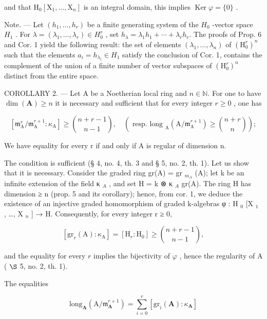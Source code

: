 and that \(\mathrm{H}_0[\mathrm{X}_1, \dots, \mathrm{X}_n]\) is an integral domain, this implies \(\operatorname{Ker} \varphi = \{0\}\) .

Note. --- Let \((h_{1}, \ldots, h_{r})\) be a finite generating system of the \(H_{0}\) -vector space \(H_{1}\) . For \(\lambda = (\lambda_{1}, \ldots, \lambda_{r}) \in H_{0}^{r}\) , set \(h_{\lambda} = \lambda_{1} h_{1} + \cdots + \lambda_{r} h_{r}\). The proofs of Prop. 6 and Cor. 1 yield the following result: the set of elements \((\lambda_{1}, \ldots, \lambda_{n})\) of \((\mathrm{H}_{0}^{r})^{n}\) such that the elements \(a_{i} = h_{\lambda_{i}} \in H_{1}\) satisfy the conclusion of Cor. 1, contains the complement of the union of a finite number of vector subspaces of \((\mathrm{H}_{0}^{r})^{n}\) distinct from the entire space.

COROLLARY 2. --- Let A be a Noetherian local ring and \(n\in\mathbb{N}\). For one to have \(\dim(\mathbf{A})\geqslant n\) it is necessary and sufficient that for every integer \(r\geqslant0\) , one has

\[
\left[ \mathfrak {m} _ {\mathrm{A}} ^ {r} / \mathfrak {m} _ {\mathrm{A}} ^ {r + 1}: \kappa_ {\mathrm{A}} \right] \geqslant \binom {n + r - 1} {n - 1}, \quad \left(\text { resp.   long } _ {\mathrm{A}} (\mathrm{A} / \mathfrak {m} _ {\mathrm{A}} ^ {r + 1}) \geqslant \binom {n + r} {n}\right);
\]

We have equality for every r if and only if A is regular of dimension n.

The condition is sufficient (§ 4, no. 4, th. 3 and § 5, no. 2, th. 1). Let us show that it is necessary. Consider the graded ring gr(A) = gr \(_{m_A}\) (A); let k be an infinite extension of the field κ \(_A\) , and set H = k ⊗ κ \(_A\) gr(A). The ring H has dimension ≥ n (prop. 5 and its corollary); hence, from cor. 1, we deduce the existence of an injective graded homomorphism of graded k-algebras φ : H \(_0\) {[}X \(_1\) , \ldots, X \(_n\) {]} → H. Consequently, for every integer r ≥ 0,

\[
\left[ \mathrm{gr} _ {r} (\mathrm{A}): \kappa_ {\mathrm{A}} \right] = \left[ \mathrm{H} _ {r}: \mathrm{H} _ {0} \right] \geqslant \binom {n + r - 1} {n - 1},
\]

and the equality for every \(r\) implies the bijectivity of \(\varphi\) , hence the regularity of A ( \(\S\) 5, no. 2, th. 1).

The equalities

\[
\mathrm{long} _ {\mathbf {A}} (\mathrm{A} / \mathfrak {m} _ {\mathbf {A}} ^ {r + 1}) = \sum_ {i = 0} ^ {r} \left[ \mathrm{gr} _ {i} (\mathbf {A}): \kappa_ {\mathbf {A}} \right]
\]

